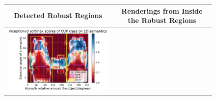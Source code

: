 \begin{figure}[h]
\centering
\tabcolsep=0.03cm
   \begin{tabular}{c|c}  \hline
   \textbf{Detected Robust Regions} & \textbf{Renderings from Inside the Robust Regions} \\  \hline
\includegraphics[width = 9.5cm]{supimages/qualitative/Inceptionv3_cup_1_regions.pdf} & 

\end{tabular}
\end{figure}
